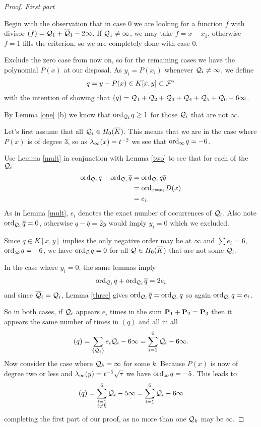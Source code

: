 \documentclass[english,11pt,a4paper]{article}
\begin{document}
\begin{proof}\textit{First part}

  Begin with the observation that in case 0 we are looking for a function $f$ with divisor $(f) = \q_1 + \bar \q_1 - 2 \infty$. If $\q_1 \neq \infty$, we may take $f = x-x_1$, otherwise $f = 1$ fills the criterion, so we are completely done with case 0.

  Exclude the zero case from now on, so for the remaining cases we have the polynomial $P(x)$ at our disposal. As $y_i = P(x_i)$ whenever $\q_i \neq \infty$, we define
  \begin{align*}
    q = y -P(x) \in K[x,y] \subset \F^*
  \end{align*}
  with the intention of showing that $(q) = \q_1 + \q_2 + \q_3 + \q_4 + \q_5 + \q_6 - 6 \infty$.

  By Lemma \ref{one} (b) we know that $\ordqi q \geq 1$ for those $\q_i$ that are not $\infty$.

  Let's first assume that all $\q_i \in \enkb$. This means that we are in the case where $P(x)$ is of degree 3, so as $\li (x) = t^{-2}$ we see that $\ordi q = -6$.

  Use Lemma \ref{mult} in conjunction with Lemma \ref{two} to see that for each of the $\q_i$
  \begin{align*}
    \ordqi q + \ordqi \bar q &= \ordqi q \bar q\\
                    &= \text{ord}_{x=x_i}\hspace{0.4mm} D(x)\\
                    &= e_i.
  \end{align*}
  As in Lemma \ref{mult}, $e_i$ denotes the exact number of occurrences of $\q_i$. Also note $\ordqi \bar q = 0$, otherwise $q - \bar q = 2y$ would imply $y_i = 0$ which we excluded.

  Since $q \in K[x,y]$ implies the only negative order may be at $\infty$ and $\sum e_i = 6$, $\ordi q = -6$, we have $\ordq q = 0$ for all $\q \in \enkb$ that are not some $\q_i$.

  In the case where $y_i = 0$, the same lemmas imply
  \begin{align*}
    \ordqi q + \ordqi \bar q = 2e_i
  \end{align*}
  and since $\bar \q_i = \q_i$, Lemma \ref{three} gives $\ordqi \bar q = \ordqi q$ so again $\ordqi q = e_i$.

  So in both cases, if $\q_i$ appears $e_i$ times in the sum $\P_1 + \P_2 = \P_3$ then it appears the same number of times in $(q)$ and all in all
  \begin{align*}
    (q) = \sum_{\{\q_i\}} e_i \q_i - 6 \infty = \sum_{i=1}^6 \q_i - 6 \infty.
  \end{align*}
  Now consider the case where $\q_k = \infty$ for some $k$. Because $P(x)$ is now of degree two or less and $\li(y) = t^{-5}\sqrt \tau$ we have $\ordi q = -5$. This leads to
  \begin{align*}
    (q) = \sum_{\substack{i=1 \\ i \neq k}}^6 \q_i - 5 \infty = \sum_{i=1}^6 \q_i - 6 \infty
  \end{align*}
  completing the first part of our proof, as no more than one $\q_k$ may be $\infty$.


\end{proof}
\end{document}

